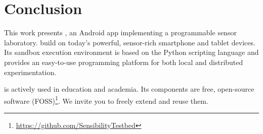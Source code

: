 \section{Conclusion}\label{sec:conclusion}

This work presents \sys, 
an Android app implementing a programmable 
sensor laboratory. \sys build on today's powerful, sensor-rich 
smartphone and tablet devices. Its sandbox execution environment is 
based on the Python scripting language and provides an easy-to-use 
programming platform for both local and distributed experimentation.

\sys is actively used in education and academia.
Its components are free, open-source software (FOSS)\footnote{\url{https://github.com/SensibilityTestbed}}. 
We invite you to freely extend and reuse them.
